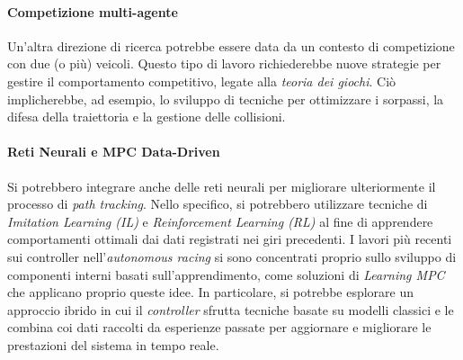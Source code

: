 \paragraph{Competizione multi-agente} Un'altra direzione di ricerca potrebbe
essere data da un contesto di competizione con due (o più) veicoli. 
Questo tipo di lavoro richiederebbe nuove strategie per gestire il comportamento competitivo,
legate alla \textit{teoria dei giochi}. Ciò implicherebbe, ad esempio, lo sviluppo di tecniche 
per ottimizzare i sorpassi, la difesa della traiettoria e la gestione delle collisioni.
\paragraph{Reti Neurali e MPC Data-Driven} Si potrebbero integrare anche delle reti neurali \cite{TATULEACODREAN20206031, fuchs2021super} per
migliorare ulteriormente il processo di \textit{path tracking}. 
Nello specifico, si potrebbero utilizzare tecniche di \textit{Imitation Learning (IL)} e 
\textit{Reinforcement Learning (RL)} al fine di apprendere comportamenti ottimali dai dati registrati nei giri precedenti.
I lavori più recenti sui controller nell'\textit{autonomous racing} si sono concentrati
proprio sullo sviluppo di componenti interni basati sull'apprendimento, come soluzioni di 
\textit{Learning MPC} \cite{xue2024learning, rosolia2019learning} che applicano proprio queste idee.
In particolare, si potrebbe esplorare un approccio ibrido in cui il \textit{controller}
sfrutta tecniche basate su modelli classici e le combina coi dati raccolti da
esperienze passate per aggiornare e migliorare le prestazioni del sistema in tempo reale.
